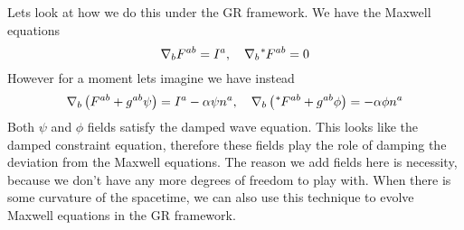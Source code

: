 \documentclass[letterpaper, 11pt]{article}
\numberwithin{equation}{section}
\numberwithin{figure}{section}
\begin{document}
Lets look at how we do this under the GR framework. We have the Maxwell
equations
\begin{equation}
  \label{eq:41}
  \nabla_{b}F^{ab} = I^a, \quad \nabla_{b}\tensor[^{*}]{F}{^{ab}} = 0
\end{equation}
However for a moment lets imagine we have instead
\begin{equation}
  \label{eq:42}
  \nabla_{b}\left( F^{ab} + g^{ab}\psi \right) = I^a - \alpha\psi n^{a},\quad \nabla_{b}\left( \tensor[^{*}]{F}{^{ab}} + g^{ab}\phi \right) = -\alpha\phi n^{a}
\end{equation}
Both $\psi$ and $\phi$ fields satisfy the damped wave equation. This looks like
the damped constraint equation, therefore these fields play the role of damping
the deviation from the Maxwell equations. The reason we add fields here is
necessity, because we don't have any more degrees of freedom to play with. When
there is some curvature of the spacetime, we can also use this technique to
evolve Maxwell equations in the GR framework.
\end{document}
